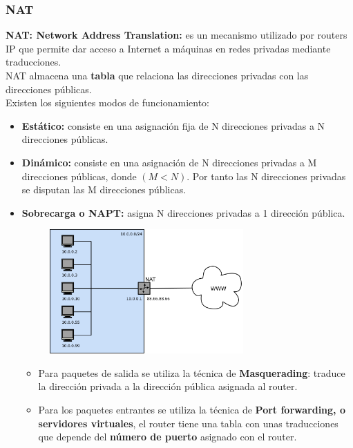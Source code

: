 \begin{onepage}
    \subsubsection{NAT}
    \textbf{NAT: Network Address Translation:} es un mecanismo utilizado por routers IP que permite dar acceso a Internet a máquinas en redes privadas mediante traducciones.\\
    
    NAT almacena una \textbf{tabla} que relaciona las direcciones privadas con las direcciones públicas.\\
    
    Existen los siguientes modos de funcionamiento:
    \begin{itemize}
        \item \textbf{Estático: }consiste en una asignación fija de N direcciones privadas a N direcciones públicas.
        \item \textbf{Dinámico: }consiste en una asignación de N direcciones privadas a M direcciones públicas, donde $(M < N)$. Por tanto las N direcciones privadas se disputan las M direcciones públicas.
        \item \textbf{Sobrecarga o NAPT: }asigna N direcciones privadas a 1 dirección pública.
        \begin{figure}[H]\centering\includegraphics[width=0.7\textwidth]{img/NAT.png}\end{figure}
        \begin{itemize}
            \item Para paquetes de salida se utiliza la técnica de \textbf{Masquerading}: traduce la dirección privada a la dirección pública asignada al router. 
            \item Para los paquetes entrantes se utiliza la técnica de \textbf{Port forwarding, o servidores virtuales}, el router tiene una tabla con unas traducciones que depende del \textbf{número de puerto} asignado con el router.
        \end{itemize}
    \end{itemize}
\end{onepage}